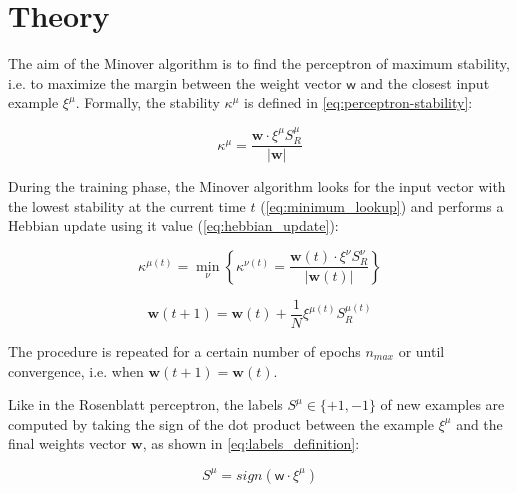 \section{Theory}
\label{sec:theory}

The aim of the Minover algorithm is to find the perceptron of maximum stability, i.e. to maximize the margin between the weight vector $\bm{\mathsf{w}}$ and the closest input example $\xi^\mu$. Formally, the stability $\kappa^\mu$ is defined in \cref{eq:perceptron-stability}:

\begin{equation}
    \kappa^\mu = \frac{\mathsf{\bm{w}} \cdotp \xi^\mu S^\mu_R}{\lvert \mathsf{\bm{w}} \rvert}
    \label{eq:perceptron-stability}
\end{equation}

During the training phase, the Minover algorithm looks for the input vector with the lowest stability at the current time $t$ (\cref{eq:minimum_lookup}) and performs a Hebbian update using it value (\cref{eq:hebbian_update}):

\begin{equation}
    \kappa^{\mu(t)} = \min_\nu \left \{ \kappa^{\nu(t)} =  \frac{\mathsf{\bm{w}}(t) \cdotp \xi^\nu S^\nu_R}{\lvert \mathsf{\bm{w}}(t) \rvert} \right \}
    \label{eq:minimum_lookup}
\end{equation}

\begin{equation}
    \mathsf{\bm{w}}(t+1) = \mathsf{\bm{w}}(t) + \frac{1}{N} \xi^{\mu(t)} S^{\mu(t)}_R
    \label{eq:hebbian_update}
\end{equation}

The procedure is repeated for a certain number of epochs $n_{max}$ or until convergence, i.e. when $\mathsf{\bm{w}}(t+1) = \mathsf{\bm{w}}(t)$.

Like in the Rosenblatt perceptron, the labels $S^\mu \in \{+1, -1\}$ of new examples are computed by taking the sign of the dot product between the example $\xi^\mu$ and the final weights vector $\mathsf{\bm{w}}$, as shown in \cref{eq:labels_definition}:

\begin{equation}
    S^\mu = sign(\mathsf{w} \cdotp \xi^\mu)
    \label{eq:labels_definition}
\end{equation}
